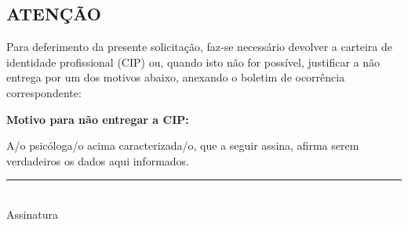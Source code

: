 \documentclass[openright, oneside, a4paper, article, brazil]{abntex2}
\begin{document}
\subsection*{ATENÇÃO}
Para deferimento da presente solicitação, faz-se necessário devolver a carteira de identidade profissional (CIP) ou, quando isto não for possível, justificar a não entrega por um dos motivos abaixo, anexando o boletim de ocorrência correspondente:

\textbf{Motivo para não entregar a CIP:} 
%
%

\vspace*{1.5\baselineskip}

\noindent A/o psicóloga/o acima caracterizada/o, que a seguir assina, afirma serem verdadeiros os dados aqui informados.
\vspace*{1.5\baselineskip}

\centering
\rule{21em}{0.4pt}\\
Assinatura
\end{document}
